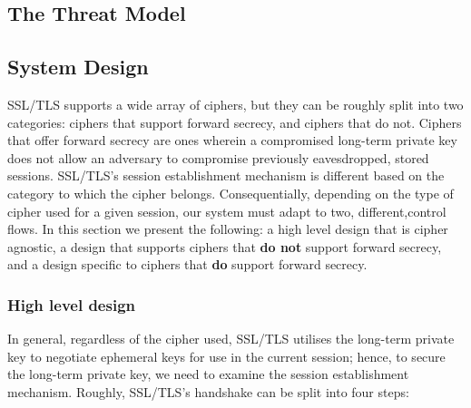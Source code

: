 \documentclass[../main.tex]{subfiles}
\begin{document}
\subsection{The Threat Model}


\subsection{System Design}%
SSL/TLS supports a wide array of ciphers, but they can be roughly
split into two categories: ciphers that support forward secrecy, and
ciphers that do not. Ciphers that offer forward secrecy are ones
wherein a compromised long-term private key does not allow an
adversary to compromise previously eavesdropped, stored
sessions. SSL/TLS's session establishment mechanism is different based
on the category to which the cipher belongs. Consequentially,
depending on the type of cipher used for a given session, our system
must adapt to two, different,control flows. In this section we present
the following: a high level design that is cipher agnostic, a design
that supports ciphers that \textbf{do not} support forward secrecy,
and a design specific to ciphers that \textbf{do} support forward
secrecy.

\subsubsection*{High level design}
In general, regardless of the cipher used, SSL/TLS utilises the
long-term private key to negotiate ephemeral keys for use in the
current session; hence, to secure the long-term private key, we need
to examine the session establishment mechanism. Roughly, SSL/TLS's
handshake can be split into four steps:
\end{document}
